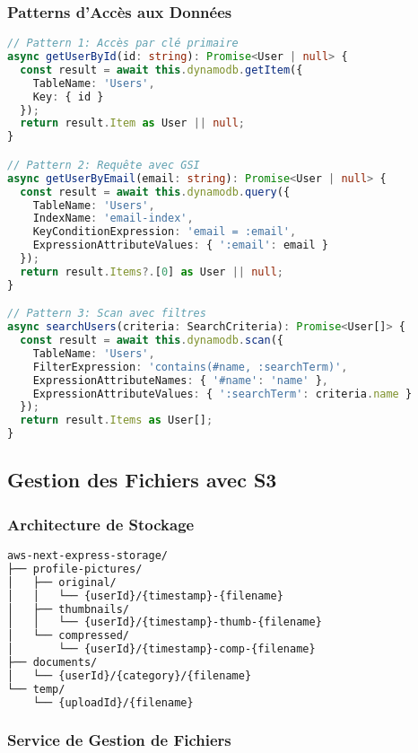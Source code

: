 \subsubsection{Patterns d'Accès aux Données}

\begin{lstlisting}[language=TypeScript, caption=Patterns DynamoDB]
// Pattern 1: Accès par clé primaire
async getUserById(id: string): Promise<User | null> {
  const result = await this.dynamodb.getItem({
    TableName: 'Users',
    Key: { id }
  });
  return result.Item as User || null;
}

// Pattern 2: Requête avec GSI
async getUserByEmail(email: string): Promise<User | null> {
  const result = await this.dynamodb.query({
    TableName: 'Users',
    IndexName: 'email-index',
    KeyConditionExpression: 'email = :email',
    ExpressionAttributeValues: { ':email': email }
  });
  return result.Items?.[0] as User || null;
}

// Pattern 3: Scan avec filtres
async searchUsers(criteria: SearchCriteria): Promise<User[]> {
  const result = await this.dynamodb.scan({
    TableName: 'Users',
    FilterExpression: 'contains(#name, :searchTerm)',
    ExpressionAttributeNames: { '#name': 'name' },
    ExpressionAttributeValues: { ':searchTerm': criteria.name }
  });
  return result.Items as User[];
}
\end{lstlisting}

\subsection{Gestion des Fichiers avec S3}

\subsubsection{Architecture de Stockage}

\begin{lstlisting}[language=bash, caption=Organisation des buckets S3]
aws-next-express-storage/
├── profile-pictures/
│   ├── original/
│   │   └── {userId}/{timestamp}-{filename}
│   ├── thumbnails/
│   │   └── {userId}/{timestamp}-thumb-{filename}
│   └── compressed/
│       └── {userId}/{timestamp}-comp-{filename}
├── documents/
│   └── {userId}/{category}/{filename}
└── temp/
    └── {uploadId}/{filename}
\end{lstlisting}

\subsubsection{Service de Gestion de Fichiers}

